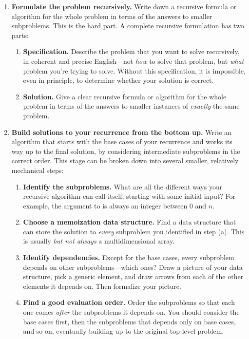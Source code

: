 \begin{enumerate}
\item \textbf{Formulate the problem recursively.}
Write down a recursive formula or algorithm for the whole problem in terms of the answers to smaller subproblems.
This is the hard part.
A complete recursive formulation has two parts:
\begin{enumerate}
\item \textbf{Specification.}
Describe the problem that you want to solve recursively, in coherent and precise English---not \textit{how} to solve that problem, but \textit{what} problem you’re trying to solve.
Without this specification, it is impossible, even in principle, to determine whether your solution is correct.
\item \textbf{Solution.}
Give a clear recursive formula or algorithm for the whole problem in terms of the answers to smaller instances of \textit{exactly} the same problem.
\end{enumerate}
\item \textbf{Build solutions to your recurrence from the bottom up.}
Write an algorithm that starts with the base cases of your recurrence and works its way up to the final solution, by considering intermediate subproblems in the correct order.
This stage can be broken down into several smaller, relatively mechanical steps:
\begin{enumerate}
\item \textbf{Identify the subproblems.}
What are all the different ways your recursive algorithm can call itself, starting with some initial input?
For example, the argument to  is always an integer between $0$ and $n$.
\item \textbf{Choose a memoization data structure.}
Find a data structure that can store the solution to \textit{every} subproblem you identified in step (a).
This is usually \textit{but not always} a multidimensional array.
\item \textbf{Identify dependencies.}
Except for the base cases, every subproblem depends on other subproblems---which ones?
Draw a picture of your data structure, pick a generic element, and draw arrows from each of the other elements it depends on.
Then formalize your picture.
\item \textbf{Find a good evaluation order.}
Order the subproblems so that each one comes \textit{after} the subproblems it depends on.
You should consider the base cases first, then the subproblems that depends only on base cases, and so on, eventually building up to the original top-level problem.

\end{enumerate}
\end{enumerate}
